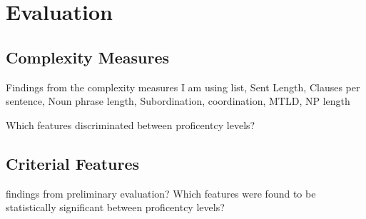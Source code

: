 \chapter{Evaluation} 

\section{Complexity Measures}
Findings from the complexity measures I am using 
list, Sent Length, Clauses per sentence, Noun phrase length,  Subordination, coordination, MTLD, NP length

Which features discriminated between proficentcy levels?

\section{Criterial Features}
findings from preliminary evaluation?  Which features were found to be statistically significant between proficentcy levels?